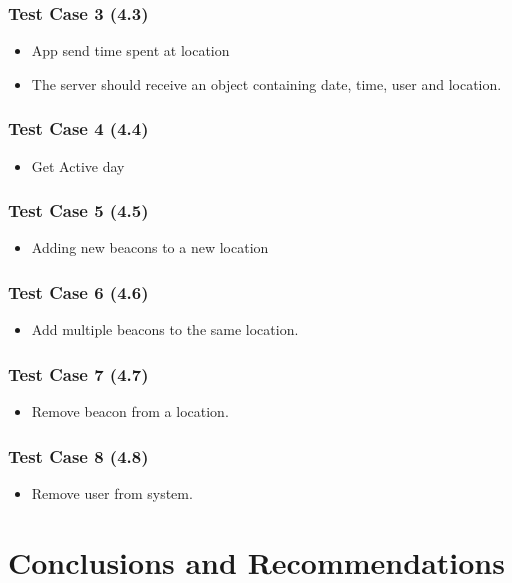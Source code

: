 \documentclass[11pt]{article}
\begin{document}
\subsubsection{Test Case 3 (4.3)}
\begin{itemize}
	\item App send time spent at location
	\item The server should receive an object containing date, time, user and location.
\end{itemize}

\subsubsection{Test Case 4 (4.4)}
\begin{itemize}
	\item Get Active day
\end{itemize}

\subsubsection{Test Case 5 (4.5)}
\begin{itemize}
	\item Adding new beacons to a new location
\end{itemize}

\subsubsection{Test Case 6 (4.6)}
\begin{itemize}
	\item Add multiple beacons to the same location.
\end{itemize}

\subsubsection{Test Case 7 (4.7)}
\begin{itemize}
	\item Remove beacon from a location.
\end{itemize}
\subsubsection{Test Case 8 (4.8)}
\begin{itemize}
	\item Remove user from system.
\end{itemize}

\section{Conclusions and Recommendations}
\end{document}
